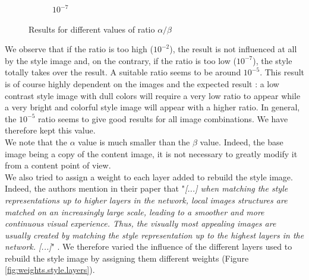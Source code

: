 \documentclass[twocolumn,superscriptaddress,aps, floatfix]{revtex4-1}
\begin{document}
\begin{figure}[ht]
\begin{subfigure}[b]{0.13\textwidth}
            \caption{$10^{-7}$}
        \end{subfigure}
        \caption{Results for different values of ratio $\alpha/\beta$}
        \label{fig:weights.ratio}
    \end{figure}
    
    We observe that if the ratio is too high ($10^{-2}$), the result is not influenced at all by the style image and, on the contrary, if the ratio is too low ($10^{-7}$), the style totally takes over the result. A suitable ratio seems to be around $10^{-5}$. This result is of course highly dependent on the images and the expected result : a low contrast style image with dull colors will require a very low ratio to appear while a very bright and colorful style image will appear with a higher ratio. In general, the $10^{-5}$ ratio seems to give good results for all image combinations. We have therefore kept this value.\\
    
    We note that the $\alpha$ value is much smaller than the $\beta$ value. Indeed, the base image being a copy of the content image, it is not necessary to greatly modify it from a content point of view.\\
    
    We also tried to assign a weight to each layer added to rebuild the style image. Indeed, the authors mention in their paper that "\emph{[...] when matching the style representations up to higher layers in the network, local images structures are matched on an increasingly large scale, leading to a smoother and more continuous visual experience. Thus, the visually most appealing images are usually created by matching the style representation up to the highest layers in the network. [...]}" \cite{DBLP:journals/corr/GatysEB15a}. We therefore varied the influence of the different layers used to rebuild the style image by assigning them different weights (Figure \ref{fig:weights.style.layers}).
\end{document}
